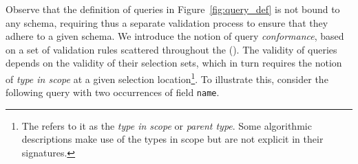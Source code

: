 Observe that the definition of queries in Figure~\ref{fig:query_def}
is not bound to any schema, requiring thus a separate validation
process to ensure that they adhere to a given schema. We introduce the
notion of query \textit{conformance}, based on a set of validation
rules scattered throughout the \spec (\cf \cite[\S5]{gqlspec}). The
validity of queries depends on the validity of their selection sets,
which in turn requires the notion of \textit{type in scope} at a
given selection location\footnote{The \spec refers to it as the \emph{type in scope} or \emph{parent type}. Some algorithmic descriptions make use of the types in scope but are not explicit in their signatures.}. %
To illustrate this, consider the following query with two occurrences of field \texttt{name}.

